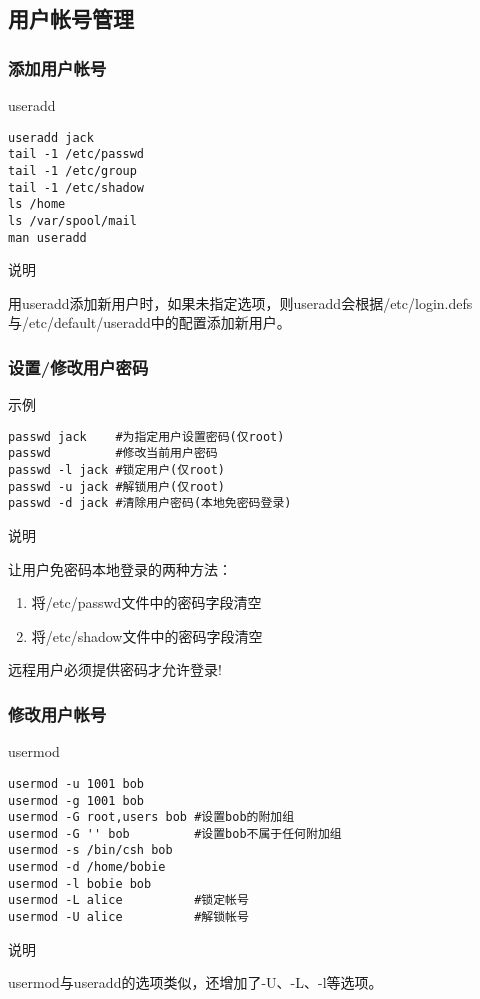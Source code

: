 \documentclass[xcolor=svgnames,presentation]{beamer}
\begin{document}
\subsection{用户帐号管理}
\label{sec-1-3}
\begin{frame}[fragile]
\frametitle{添加用户帐号}
\label{sec-1-3-1}
\begin{block}{useradd}
\label{sec-1-3-1-1}


\begin{verbatim}
useradd jack
tail -1 /etc/passwd
tail -1 /etc/group
tail -1 /etc/shadow
ls /home
ls /var/spool/mail
man useradd
\end{verbatim}
\end{block}
\begin{exampleblock}{说明}
\label{sec-1-3-1-2}

用useradd添加新用户时，如果未指定选项，则useradd会根据/etc/login.defs与/etc/default/useradd中的配置添加新用户。
\end{exampleblock}
\end{frame}
\begin{frame}[fragile]
\frametitle{设置/修改用户密码}
\label{sec-1-3-2}
\begin{exampleblock}{示例}
\label{sec-1-3-2-1}


\begin{verbatim}
passwd jack    #为指定用户设置密码(仅root)
passwd         #修改当前用户密码
passwd -l jack #锁定用户(仅root)
passwd -u jack #解锁用户(仅root)
passwd -d jack #清除用户密码(本地免密码登录)
\end{verbatim}
\end{exampleblock}
\begin{block}{说明}
\label{sec-1-3-2-2}

让用户免密码本地登录的两种方法：
\begin{enumerate}
\item 将/etc/passwd文件中的密码字段清空
\item 将/etc/shadow文件中的密码字段清空
\end{enumerate}
远程用户必须提供密码才允许登录!
\end{block}
\end{frame}
\begin{frame}[fragile]
\frametitle{修改用户帐号}
\label{sec-1-3-3}
\begin{block}{usermod}
\label{sec-1-3-3-1}


\begin{verbatim}
usermod -u 1001 bob
usermod -g 1001 bob
usermod -G root,users bob #设置bob的附加组
usermod -G '' bob         #设置bob不属于任何附加组
usermod -s /bin/csh bob
usermod -d /home/bobie
usermod -l bobie bob
usermod -L alice          #锁定帐号
usermod -U alice          #解锁帐号
\end{verbatim}
\end{block}
\begin{exampleblock}{说明}
\label{sec-1-3-3-2}

usermod与useradd的选项类似，还增加了-U、-L、-l等选项。
\end{exampleblock}
\end{frame}
\end{document}
